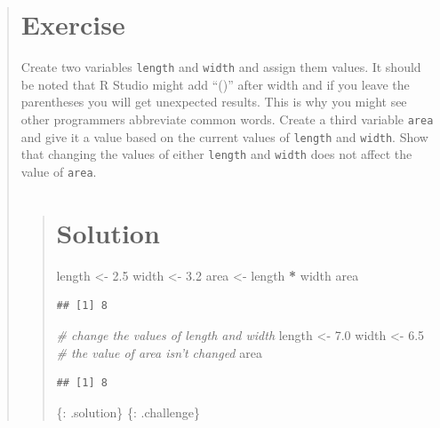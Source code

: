 \documentclass[]{book}
\newenvironment{Shaded}{\begin{snugshade}}{\end{snugshade}}
\newcommand{\FloatTok}[1]{\textcolor[rgb]{0.00,0.00,0.81}{#1}}
\newcommand{\StringTok}[1]{\textcolor[rgb]{0.31,0.60,0.02}{#1}}
\newcommand{\CommentTok}[1]{\textcolor[rgb]{0.56,0.35,0.01}{\textit{#1}}}
\newcommand{\OperatorTok}[1]{\textcolor[rgb]{0.81,0.36,0.00}{\textbf{#1}}}
\newcommand{\NormalTok}[1]{#1}
\begin{document}
\begin{quote}
\section{Exercise}\label{exercise-2}

Create two variables \texttt{length} and \texttt{width} and assign them
values. It should be noted that R Studio might add ``()'' after width
and if you leave the parentheses you will get unexpected results. This
is why you might see other programmers abbreviate common words. Create a
third variable \texttt{area} and give it a value based on the current
values of \texttt{length} and \texttt{width}. Show that changing the
values of either \texttt{length} and \texttt{width} does not affect the
value of \texttt{area}.

\begin{quote}
\section{Solution}\label{solution-2}

\begin{Shaded}
\begin{Highlighting}[]
\NormalTok{length <-}\StringTok{ }\FloatTok{2.5}
\NormalTok{width <-}\StringTok{ }\FloatTok{3.2}
\NormalTok{area <-}\StringTok{ }\NormalTok{length }\OperatorTok{*}\StringTok{ }\NormalTok{width}
\NormalTok{area}
\end{Highlighting}
\end{Shaded}

\begin{verbatim}
## [1] 8
\end{verbatim}

\begin{Shaded}
\begin{Highlighting}[]
\CommentTok{# change the values of length and width}
\NormalTok{length <-}\StringTok{ }\FloatTok{7.0}
\NormalTok{width <-}\StringTok{ }\FloatTok{6.5}
\CommentTok{# the value of area isn't changed}
\NormalTok{area}
\end{Highlighting}
\end{Shaded}

\begin{verbatim}
## [1] 8
\end{verbatim}

\{: .solution\} \{: .challenge\}
\end{quote}
\end{quote}
\end{document}
